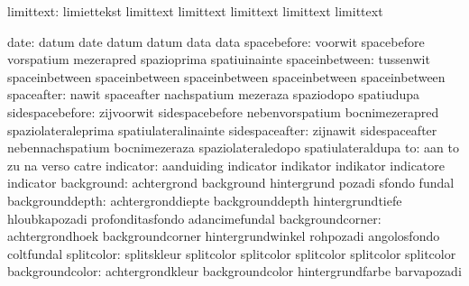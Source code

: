                 limittext: limiettekst               limittext
                           limittext                 limittext
                           limittext                 limittext

                     date: datum                     date
                           datum                     datum
                           data                      data
              spacebefore: voorwit                   spacebefore
                           vorspatium                mezerapred
                           spazioprima               spatiuinainte
           spaceinbetween: tussenwit                 spaceinbetween
                           spaceinbetween            spaceinbetween
                           spaceinbetween            spaceinbetween
               spaceafter: nawit                     spaceafter
                           nachspatium               mezeraza
                           spaziodopo                spatiudupa
          sidespacebefore: zijvoorwit                sidespacebefore
                           nebenvorspatium           bocnimezerapred
                           spaziolateraleprima       spatiulateralinainte
           sidespaceafter: zijnawit                  sidespaceafter
                           nebennachspatium          bocnimezeraza
                           spaziolateraledopo        spatiulateraldupa
                       to: aan                       to
                           zu                        na
                           verso                     catre
                indicator: aanduiding                indicator
                           indikator                 indikator
                           indicatore                indicator
               background: achtergrond               background
                           hintergrund               pozadi
                           sfondo                    fundal
          backgrounddepth: achtergronddiepte         backgrounddepth
                           hintergrundtiefe          hloubkapozadi
                           profonditasfondo          adancimefundal
         backgroundcorner: achtergrondhoek           backgroundcorner
                           hintergrundwinkel         rohpozadi
                           angolosfondo              coltfundal
 splitcolor: splitskleur splitcolor
             splitcolor  splitcolor
             splitcolor  splitcolor
          backgroundcolor: achtergrondkleur          backgroundcolor
                           hintergrundfarbe          barvapozadi
